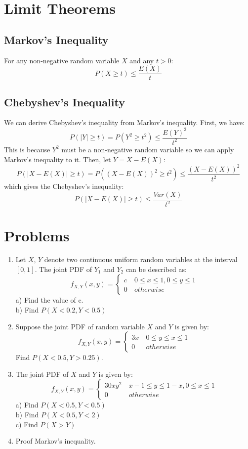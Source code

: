 \documentclass[11pt]{article}
\begin{document}
\section{Limit Theorems}
\subsection{Markov's Inequality}
For any non-negative random variable $X$ and any $t > 0$:
$$P(X \geq t) \leq \frac{E(X)}{t} $$

\subsection{Chebyshev's Inequality}
We can derive Chebyshev's inequality from Markov's inequality.
First, we have:
$$P(|Y| \geq t) = P(Y^2 \geq t^2) \leq \frac{E(Y)^2}{t^2} $$
This is because $Y^2$ must be a non-negative random variable so we can apply Markov's inequality to it.
Then, let $Y = X - E(X)$:
$$P(|X-E(X)| \geq t) = P((X - E(X))^2 \geq t^2) \leq \frac{(X-E(X))^2}{t^2} $$
which gives the Chebyshev's inequality:
$$P(|X-E(X)| \geq t) \leq \frac{Var(X)}{t^2}$$

\section{Problems}
\begin{enumerate}
  \item Let $X$, $Y$ denote two continuous uniform random variables at the interval $[0,1]$. The joint PDF of $Y_1$ and $Y_2$ can be described as:
  \begin{equation*}
    f_{X,Y}(x,y) = \begin{cases}
      c & \: 0 \leq x \leq 1, 0 \leq y \leq 1 \\
      0 & \: otherwise
    \end{cases}
  \end{equation*}
  a) Find the value of c.\\
  b) Find $P(X<0.2, Y<0.5)$\\
  \item Suppose the joint PDF of random variable $X$ and $Y$ is given by:
  \begin{equation*}
    f_{X,Y}(x,y) = \begin{cases}
      3x & \:0 \leq y \leq x \leq 1 \\
      0 & \: otherwise
    \end{cases}
  \end{equation*}
  Find $P(X<0.5, Y>0.25)$.
  \item The joint PDF of $X$ and $Y$ is given by:
  \begin{equation*}
    f_{X,Y}(x,y) = \begin{cases}
      30xy^2 & \: x-1 \leq y \leq 1-x, 0 \leq x \leq 1\\
      0 & \: otherwise
    \end{cases}
  \end{equation*}
  a) Find $P(X<0.5, Y<0.5)$ \\
  b) Find $P(X<0.5, Y<2)$ \\
  c) Find $P(X > Y)$
  \item Proof Markov's inequality.
\end{enumerate}
\end{document}
